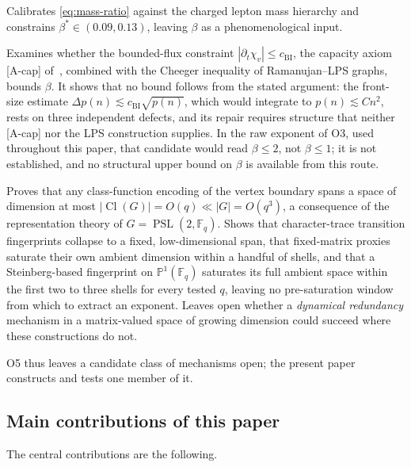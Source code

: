 \documentclass[11pt]{article}
\theoremstyle{definition}
\theoremstyle{remark}
\DeclareMathOperator{\Cl}{Cl}
\DeclareMathOperator{\PSL}{PSL}
\newcommand{\F}{\mathbb{F}}
\begin{document}
    \begin{description}[leftmargin=2em]
\item[O3~\cite{Beau2026a7}] Calibrates \eqref{eq:mass-ratio} against the charged lepton
mass hierarchy and constrains $\beta^* \in (0.09, 0.13)$, leaving $\beta$ as a
phenomenological input.

\item[O4~\cite{Beau2026a8}] Examines whether the bounded-flux constraint
$|\partial_t \chi_v| \leq c_{\mathrm{BI}}$, the capacity axiom [A-cap] of~\cite{Beau2026c},
combined with the Cheeger inequality of Ramanujan--LPS graphs, bounds $\beta$.
It shows that no bound follows from the stated argument: the front-size estimate
$\Delta p(n) \lesssim c_{\mathrm{BI}} \sqrt{p(n)}$, which would integrate to $p(n) \lesssim C n^2$,
rests on three independent defects, and its repair requires structure that neither [A-cap] nor
the LPS construction supplies.
In the raw exponent of O3, used throughout this paper, that candidate would read $\beta \leq 2$,
not $\beta \leq 1$; it is not established, and no structural upper bound on $\beta$ is available
from this route.

\item[O5~\cite{Beau2026a9}] Proves that any class-function encoding of the vertex boundary spans
a space of dimension at most $|\Cl(G)| = O(q) \ll |G| = O(q^3)$, a consequence of the
representation theory of $G = \PSL(2, \F_q)$.
Shows that character-trace transition fingerprints collapse to a fixed, low-dimensional span,
that fixed-matrix proxies saturate their own ambient dimension within a handful of shells, and
that a Steinberg-based fingerprint on $\mathbb{P}^1(\F_q)$ saturates its full ambient space within
the first two to three shells for every tested $q$, leaving no pre-saturation window from which
to extract an exponent.
      Leaves open whether a \emph{dynamical redundancy} mechanism in a matrix-valued space of
      growing dimension could succeed where these constructions do not.
    \end{description}

    O5 thus leaves a candidate class of mechanisms open; the present paper constructs and tests
    one member of it.

  \subsection{Main contributions of this paper}
    \label{ssec:contributions}

    The central contributions are the following.
\end{document}
